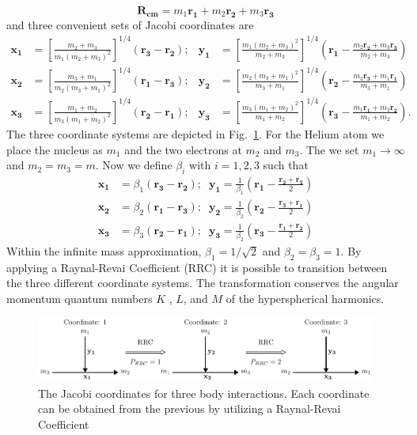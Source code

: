 \begin{equation}
\mathbf{R_{cm}} = m_1 \mathbf{r_1} + m_2 \mathbf{r_2} + m_3 \mathbf{r_3}
\end{equation}
and three convenient sets of Jacobi coordinates are
\begin{align}
\label{eq:jacobi_coords}
\mathbf{x_1} &= \left[\frac{m_2+m_3}{m_1(m_2+m_3)^2}\right]^{1/4} (\mathbf{r_3}-\mathbf{r_2}); &\mathbf{y_1} &= \left[\frac{m_1(m_2+m_3)^2}{m_2+m_3}\right]^{1/4} \left(\mathbf{r_1}- \frac{m_2\mathbf{r_2}+m_3\mathbf{r_3}}{m_2+m_3} \right)\\
\mathbf{x_2} &= \left[\frac{m_3+m_1}{m_2(m_3+m_1)^2}\right]^{1/4} (\mathbf{r_1}-\mathbf{r_3}); &\mathbf{y_2} &= \left[\frac{m_2(m_3+m_1)^2}{m_3+m_1}\right]^{1/4} \left(\mathbf{r_2}- \frac{m_3\mathbf{r_3}+m_1\mathbf{r_1}}{m_3+m_1} \right)\\
\mathbf{x_3} &= \left[\frac{m_1+m_2}{m_3(m_1+m_2)^2}\right]^{1/4} (\mathbf{r_2}-\mathbf{r_1}); &\mathbf{y_3} &= \left[\frac{m_3(m_1+m_2)^2}{m_1+m_2}\right]^{1/4} \left(\mathbf{r_3}- \frac{m_1\mathbf{r_1}+m_2\mathbf{r_2}}{m_1+m_2} \right).
\end{align}
The three coordinate systems are depicted in Fig.~\ref{fig:jacobi_coord}. For the Helium atom we place the nucleus as $m_1$ and the two electrons at $m_2$ and $m_3$. The we set $m_1\rightarrow \infty$ and $m_2=m_3=m$. Now we define $\beta_i$ with $i=1,2,3$ such that
\begin{align}
\mathbf{x_1} &= \beta_1 (\mathbf{r_3}-\mathbf{r_2}); \; \; \mathbf{y_1} = \frac{1}{\beta_1} \left(\mathbf{r_1}- \frac{\mathbf{r_2}+\mathbf{r_3}}{2} \right)\\
\mathbf{x_2} &= \beta_2 (\mathbf{r_1}-\mathbf{r_3}); \; \; \mathbf{y_2} = \frac{1}{\beta_2} \left(\mathbf{r_2}- \frac{\mathbf{r_3}+\mathbf{r_1}}{2} \right)\\
\mathbf{x_3} &= \beta_3 (\mathbf{r_2}-\mathbf{r_1}); \; \; \mathbf{y_3} = \frac{1}{\beta_2} \left(\mathbf{r_3}- \frac{\mathbf{r_1}+\mathbf{r_2}}{2} \right)
\end{align}
Within the infinite mass approximation, $\beta_1=1/\sqrt{2}$ and $\beta_2=\beta_3=1$. By applying a Raynal-Revai Coefficient (RRC) it is possible to transition between the three different coordinate systems.  The transformation conserves the angular momentum quantum numbers $K$ , $L$, and $M$ of the hyperspherical harmonics.

\begin{figure}[h!]
\centering
\includegraphics[width=\linewidth]{figs/Two_electron/coord_1.pdf}
\caption{The Jacobi coordinates for three body interactions. Each coordinate can be obtained from the previous by utilizing a Raynal-Revai Coefficient} 
  \label{fig:jacobi_coord}
\end{figure}

